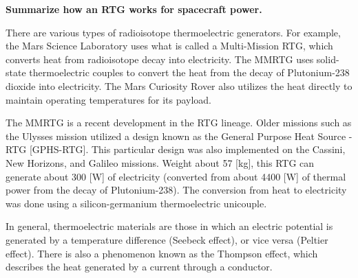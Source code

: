 \textbf{Summarize how an RTG works for spacecraft power.}

There are various types of radioisotope thermoelectric generators. For
example, the Mars Science Laboratory uses what is called a Multi-Mission
RTG, which converts heat from radioisotope decay into electricity. The
MMRTG uses solid-state thermoelectric couples to convert the heat from
the decay of Plutonium-238 dioxide into electricity. The Mars Curiosity
Rover also utilizes the heat directly to maintain operating temperatures
for its payload. 

The MMRTG is a recent development in the RTG lineage. Older missions
such as the Ulysses mission utilized a design known as the General
Purpose Heat Source - RTG [GPHS-RTG]. This particular design was also
implemented on the Cassini, New Horizons, and Galileo missions. Weight
about 57 [kg], this RTG can generate about 300 [W] of electricity
(converted from about 4400 [W] of thermal power from the decay of
Plutonium-238). The conversion from heat to electricity was done using a
silicon-germanium thermoelectric unicouple.

In general, thermoelectric materials are those in which an electric
potential is generated by a temperature difference (Seebeck effect), or
vice versa (Peltier effect). There is also a phenomenon known as the
Thompson effect, which describes the heat generated by a current through
a conductor. 

